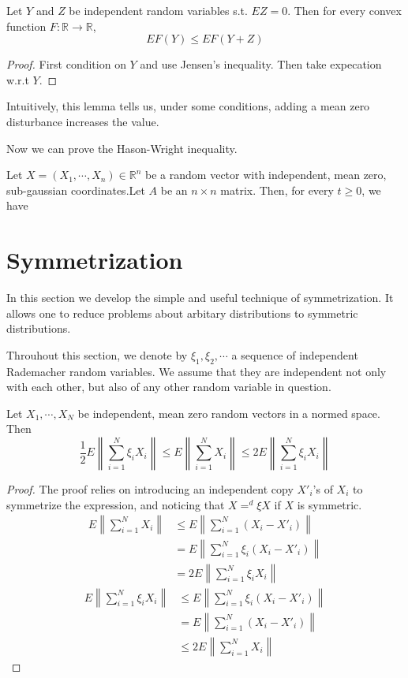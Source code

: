 \begin{lemma}
    Let $Y$ and $Z$ be independent random variables s.t. $EZ=0$. Then for every convex function $F:\mathbb{R}\to\mathbb{R}$,
    \[EF(Y)\le EF(Y+Z)\]
\end{lemma}
\begin{proof}
    First condition on $Y$ and use Jensen's inequality. Then take expecation w.r.t $Y$.
\end{proof}
\begin{remark}
    Intuitively, this lemma tells us, under some conditions, adding a mean zero disturbance increases the value.
\end{remark}

Now we can prove the Hason-Wright inequality.
\begin{theorem}
    Let $X=(X_1,\cdots,X_n)\in \mathbb{R}^n$ be a random vector with independent, 
    mean zero, sub-gaussian coordinates.Let $A$ be an $n\times n$ matrix. Then, for every $t\geq 0$, we have 
    \[ \]
\end{theorem}

\section{Symmetrization}
In this section we develop the simple and useful technique of symmetrization.
It allows one to reduce problems about arbitary distributions to symmetric distributions.
\begin{definition}
    
\end{definition}
Throuhout this section, we denote by $\xi_1,\xi_2,\cdots$ a sequence of independent Rademacher random variables.
We assume that they are independent not only with each other, but also of any other random variable in question.
\begin{lemma}[symmetrization]
    Let $X_1,\cdots,X_N$ be independent, mean zero random vectors in a normed space. Then 
    \[\frac{1}{2}E\left\|\sum_{i=1}^N\xi_iX_i\right\|\le E\left\|\sum_{i=1}^NX_i\right\|\le 2E\left\|\sum_{i=1}^N\xi_iX_i\right\|\]
\end{lemma}
\begin{proof}
    The proof relies on introducing an independent copy $X'_i$'s of $X_i$ to symmetrize the expression,
    and noticing that $X=^d \xi X$ if $X$ is symmetric.
    \begin{align*}
        E\left\|\sum_{i=1}^NX_i\right\|&\le E\left\|\sum_{i=1}^N(X_i-X'_i)\right\|\\
        &=E\left\|\sum_{i=1}^N\xi_i(X_i-X'_i)\right\|\\
        &=2 E\left\|\sum_{i=1}^N\xi_iX_i\right\|
    \end{align*}
    \begin{align*}
        E\left\|\sum_{i=1}^N\xi_iX_i\right\|&\le E\left\|\sum_{i=1}^N\xi_i(X_i-X'_i)\right\|\\
        &=E\left\|\sum_{i=1}^N(X_i-X'_i)\right\|\\
        &\le 2E\left\|\sum_{i=1}^NX_i\right\|
    \end{align*}
        
\end{proof}


